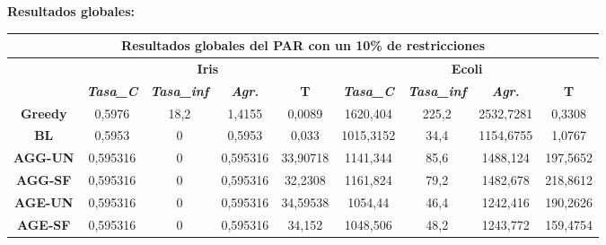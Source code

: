 \documentclass[12pt, spanish]{article}
\begin{document}
\textbf{Resultados globales:}

\begin{table}[H]
\footnotesize
\begin{tabular}{|c|c|c|c|c|c|c|c|c|}
\hline
\multicolumn{9}{|c|}{\textbf{Resultados globales del PAR con un 10\% de restricciones}}                                                                                                                                  \\ \hline
\multirow{2}{*}{}        & \multicolumn{4}{c|}{\textbf{Iris}}                                                            & \multicolumn{4}{c|}{\textbf{Ecoli}}                                                           \\ \cline{2-9} 
                         & \textit{\textbf{Tasa\_C}} & \textit{\textbf{Tasa\_inf}} & \textit{\textbf{Agr.}} & \textbf{T} & \textit{\textbf{Tasa\_C}} & \textit{\textbf{Tasa\_inf}} & \textit{\textbf{Agr.}} & \textbf{T} \\ \hline
\textbf{Greedy}          & 0,5976                    & 18,2                        & 1,4155                 & 0,0089     & 1620,404                  & 225,2                       & 2532,7281              & 0,3308     \\ \hline
\textbf{BL}              & 0,5953                    & 0                           & 0,5953                 & 0,033      & 1015,3152                 & 34,4                        & 1154,6755              & 1,0767     \\ \hline
\textbf{AGG-UN}          & 0,595316                  & 0                           & 0,595316               & 33,90718   & 1141,344                  & 85,6                        & 1488,124               & 197,5652   \\ \hline
\textbf{AGG-SF}          & 0,595316                  & 0                           & 0,595316               & 32,2308    & 1161,824                  & 79,2                        & 1482,678               & 218,8612   \\ \hline
\textbf{AGE-UN}          & 0,595316                  & 0                           & 0,595316               & 34,59538   & 1054,44                   & 46,4                        & 1242,416               & 190,2626   \\ \hline
\textbf{AGE-SF}          & 0,595316                  & 0                           & 0,595316               & 34,152     & 1048,506                  & 48,2                        & 1243,772               & 159,4754   \\ \hline

\end{tabular}
\end{table}
\end{document}
